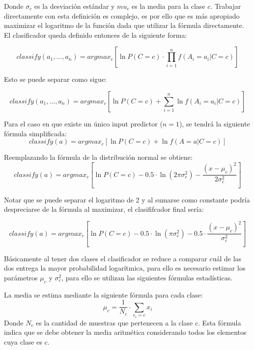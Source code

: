 \documentclass[letter, titlepage, 10pt]{article}
\begin{document}
Donde $\sigma_c$ es la desviación estándar y $mu_c$ es la media para la clase $c$. Trabajar directamente con esta definición es complejo, es por ello que es más apropiado maximizar el logaritmo de la función dada que utilizar la fórmula directamente. El clasificador queda definido entonces de la siguiente forma:

\begin{equation}
classify(a_1,...,a_n) = argmax_{c}\left[ \ln{P(C = c)\cdot \prod\limits_{i=1}^n f(A_i = a_i|C = c)}\right]
\end{equation}

Esto se puede separar como sigue:

\begin{equation}
classify(a_1,...,a_n) = argmax_{c}\left[ \ln{P(C = c)} + \sum\limits_{i=1}^n{\ln{f(A_i = a_i|C = c)}}\right]
\end{equation}


Para el caso en que existe un único input predictor ($n = 1$), se tendrá la siguiente fórmula simplificada:
\begin{equation}
classify(a) = argmax_{c}\left[ \ln{P(C = c)} + \ln{f(A = a|C = c)}\right]
\end{equation}

Reemplazando la fórmula de la distribución normal se obtiene:
\begin{equation}
classify(a) = argmax_{c}\left[ \ln{P(C = c)} -0.5\cdot \ln{(2 \pi \sigma_c^2)} - \frac{(x - \mu_c)^2}{2 \sigma_c ^2}  \right]
\end{equation}

Notar que se puede separar el logaritmo de 2 y al sumarse como constante podría despreciarse de la fórmula al maximizar, el clasififcador final sería:

\begin{equation}
classify(a) = argmax_{c}\left[ \ln{P(C = c)} -0.5\cdot \ln{(\pi \sigma_c^2)} - 0.5 \cdot \frac{(x - \mu_c)^2}{\sigma_c^2}  \right]
\end{equation}

Básicamente al tener dos clases el clasificador se reduce a comparar cuál de las dos entrega la mayor probabilidad logarítmica, para ello es necesario estimar los parámetros $\mu_c$ y $\sigma_c^2$, para ello se utilizan las siguientes fórmulas estadísticas.

La media se estima mediante la siguiente fórmula para cada clase:
\begin{equation}
\mu_c = \frac{1}{N_c}\cdot \sum\limits_{c_i = c}{x_i}
\end{equation}
Donde $N_c$ es la cantidad de muestras que pertenecen a la clase $c$. Esta fórmula indica que se debe obtener la media aritmética considerando todos los elementos cuya clase es $c$.
\end{document}

